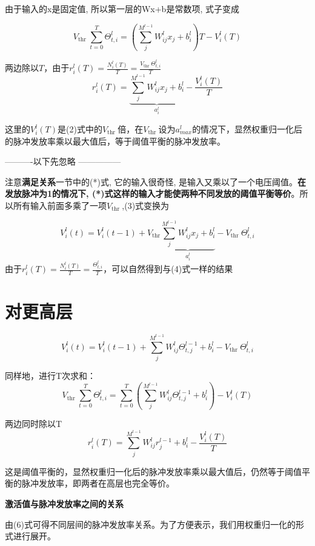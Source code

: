 \documentclass[a4paper,11pt,onecolumn,oneside,UTF8]{article}
\begin{document}
由于输入的x是固定值, 所以第一层的Wx+b是常数项, 式子变成

$$V_{\text {thr }}\sum_{t=0}^T\Theta_{t,i}^{l}=\left(\sum_j^{M^{l-1}}W_{ij}^lx_j+b_i^l\right)T - V_i^l(T)$$

两边除以$T$，由于$r_i^l(T) = \frac{N_i^l(T)}{T} = \frac{V_{\text {thr }}\Theta_{t,i}^{l}}{T}$
\begin{equation}
    r_i^l(T) = \underbrace{\sum_j^{M^{l-1}}W_{ij}^lx_j+b_i^l}_{a_i^l} - \frac{V_i^l(T)}{T}
\end{equation}

这里的$V_i^l(T)$是(2)式中的$V_{\text {thr }}$倍，在$V_{\text {thr }}$设为$a_{max}^l$的情况下，显然权重归一化后的脉冲发放率乘以最大值后，等于阈值平衡的脉冲发放率。



----------以下先忽略 ---------------

注意\textbf{满足关系}一节中的(*)式, 它的输入很奇怪, 是输入又乘以了一个电压阈值。\textbf{在发放脉冲为1的情况下, (*)式这样的输入才能使两种不同发放的阈值平衡等价}。所以所有输入前面多乘了一项$V_{\text {thr }}$,(3)式变换为

\begin{equation}
    V_i^l(t)=V_{i}^{l}(t-1)+V_{\text {thr}}\underbrace{\sum_j^{M^{l-1}}W_{ij}^lx_j+b_i^l}_{a_i^l}-V_{\text {thr }}\Theta_{t,i}^{l}
\end{equation}
由于$r_i^l(T) = \frac{N_i^l(T)}{T} = \frac{\Theta_{t,i}^{l}}{T}$，可以自然得到与(4)式一样的结果


\section*{对更高层}
$$
V_i^l(t)=V_{i}^{l}(t-1)+\sum_j^{M^{l-1}}W_{ij}^l\Theta_{t,j}^{l-1}+b_i^l-V_{\text {thr }}\Theta_{t,i}^{l}
$$

同样地，进行T次求和：
$$V_{\text {thr }}\sum_{t=0}^T\Theta_{t,i}^{l}=\sum_{t=0}^T\left(\sum_j^{M^{l-1}}W_{ij}^l\Theta_{t,j}^{l-1}+b_i^l\right) - V_i^l(T)$$

两边同时除以T
\begin{equation}
    r_i^l(T) = \sum_j^{M^{l-1}}W_{ij}^lr_j^{l-1}+b_i^l - \frac{V_i^l(T)}{T}
\end{equation}

这是阈值平衡的，显然权重归一化后的脉冲发放率乘以最大值后，仍然等于阈值平衡的脉冲发放率，即两者在高层也完全等价。

\textbf{激活值与脉冲发放率之间的关系}

由(6)式可得不同层间的脉冲发放率关系。为了方便表示，我们用权重归一化的形式进行展开。
\end{document}
